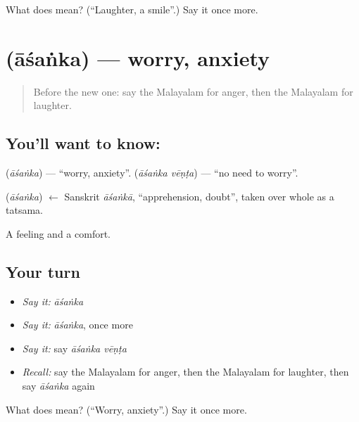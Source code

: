 \begin{tcolorbox}[breakable,colback=teal!4,colframe=teal!35!black,title={Before you move on}]
What does  mean? (\textquotedblleft{}Laughter, a smile\textquotedblright{}.) Say it once more.
\end{tcolorbox}
\section[\texorpdfstring{\ml{ആശങ്ക} (āśaṅka)}{ആശങ്ക (āśaṅka)}]{ (āśaṅka) — worry, anxiety}

\label{lesson:ML-C116-worry}



\begin{quote}
Before the new one: say the Malayalam for anger, then the Malayalam for laughter.
\end{quote}

\subsection*{You'll want to know: }
\textbf{} (\emph{āśaṅka}) — \textquotedblleft{}worry, anxiety\textquotedblright{}. \textbf{ } (\emph{āśaṅka vēṇṭa}) — \textquotedblleft{}no need to worry\textquotedblright{}.

\begin{cousinweb}
\textbf{} (\emph{āśaṅka}) $\leftarrow$ Sanskrit \emph{āśaṅkā}, \textquotedblleft{}apprehension, doubt\textquotedblright{}, taken over whole as a tatsama.
\end{cousinweb}

\begin{grammarlens}[title={What you've built}]
A feeling and a comfort.
\end{grammarlens}

\subsection*{Your turn}
\begin{itemize}
\raggedright
  \item \emph{Say it:} \emph{āśaṅka}
  \item \emph{Say it:} \emph{āśaṅka}, once more
  \item \emph{Say it:} say \emph{āśaṅka vēṇṭa}
  \item \emph{Recall:} say the Malayalam for anger, then the Malayalam for laughter, then say \emph{āśaṅka} again
\end{itemize}

\begin{tcolorbox}[breakable,colback=teal!4,colframe=teal!35!black,title={Before you move on}]
What does  mean? (\textquotedblleft{}Worry, anxiety\textquotedblright{}.) Say it once more.
\end{tcolorbox}

